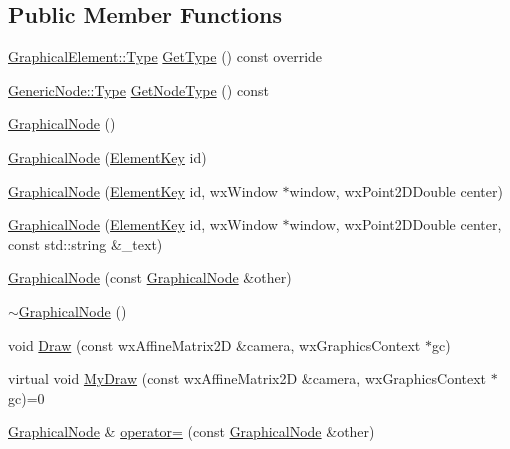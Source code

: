 \subsection*{Public Member Functions}
\begin{DoxyCompactItemize}
\item 
\hyperlink{class_graphical_element_aa485be48b901d85de97b3bd86f381d9e}{Graphical\+Element\+::\+Type} \hyperlink{class_graphical_node_a6bfbcb9a6b85dd3093a8f6541252ebfe}{Get\+Type} () const override
\item 
\hyperlink{class_generic_node_a9e7985ab9bbfa1c85091adc0ab71a6b6}{Generic\+Node\+::\+Type} \hyperlink{class_graphical_node_a4c5493ddcfca4d433421ae06eac1b19a}{Get\+Node\+Type} () const
\item 
\hyperlink{class_graphical_node_a9c34baa875b133f8c5b1da78da189f1d}{Graphical\+Node} ()
\item 
\hyperlink{class_graphical_node_a831cbab85b4aa47c9e5e45f13f840671}{Graphical\+Node} (\hyperlink{_graphical_element_8h_ade5fd6c85839a416577ff9de1605141e}{Element\+Key} id)
\item 
\hyperlink{class_graphical_node_a8b6df5a7f16ea432b12b54c13d893e36}{Graphical\+Node} (\hyperlink{_graphical_element_8h_ade5fd6c85839a416577ff9de1605141e}{Element\+Key} id, wx\+Window $\ast$window, wx\+Point2\+D\+Double center)
\item 
\hyperlink{class_graphical_node_a738f88bed48b5089d795f8778f984cc6}{Graphical\+Node} (\hyperlink{_graphical_element_8h_ade5fd6c85839a416577ff9de1605141e}{Element\+Key} id, wx\+Window $\ast$window, wx\+Point2\+D\+Double center, const std\+::string \&\+\_\+text)
\item 
\hyperlink{class_graphical_node_a63c2c7ac34c3f9b3a1383dd157cf731c}{Graphical\+Node} (const \hyperlink{class_graphical_node}{Graphical\+Node} \&other)
\item 
\hyperlink{class_graphical_node_a044a09111bb337580f2a40fcff42ef6f}{$\sim$\+Graphical\+Node} ()
\item 
void \hyperlink{class_graphical_node_a5675edef9951820c61973cd8fb242287}{Draw} (const wx\+Affine\+Matrix2D \&camera, wx\+Graphics\+Context $\ast$gc)
\item 
virtual void \hyperlink{class_graphical_node_a4a5d4f48454a9721a940499d4f59b0ce}{My\+Draw} (const wx\+Affine\+Matrix2D \&camera, wx\+Graphics\+Context $\ast$gc)=0
\item 
\hyperlink{class_graphical_node}{Graphical\+Node} \& \hyperlink{class_graphical_node_a9c5dc1b7f344e2785531318167c2826b}{operator=} (const \hyperlink{class_graphical_node}{Graphical\+Node} \&other)

\end{DoxyCompactItemize}
